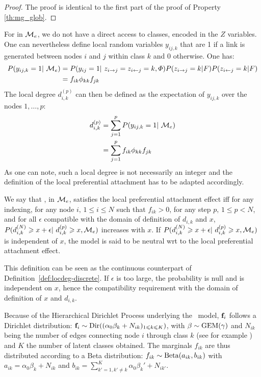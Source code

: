 \begin{proof}
The proof is identical to the first part of the proof of Property \ref{th:mg_glob}.
\end{proof}

\vspace{0.1cm}
For \textbf{\imb} in $\mathcal{M}_e$, we do not have a direct access to classes, encoded in the $Z$ variables. One can nevertheless define  local random variables $y_{ij,k}$ that are 1 if a link is generated between nodes $i$ and $j$ within class $k$ and 0 otherwise. One has:
%
\begin{align*}
P(y_{ij,k}=1 | \M_e) &= P(y_{ij}=1 | z_{i\rightarrow j} = z_{i\leftarrow j}=k, \Phi) P(z_{i\rightarrow j}=k|F)P(z_{i\leftarrow j}=k|F) \\
    &= f_{ik} \phi_{kk} f_{jk}
\end{align*}
%
The local degree $d_{i,k}^{(p)}$ can then be defined as the expectation of $y_{ij,k}$ over the nodes $1,\dotsc,p$:
%
\begin{align}\label{def:locdegimb}
d_{i,k}^{(p)} &= \sum_{j=1}^p P(y_{ij,k}=1 | \M_e)  \nonumber \\
    &= \sum_{j=1}^p f_{ik} \phi_{kk} f_{jk}
\end{align}
%
As one can note, such a local degree is not necessarily an integer and the definition of the local preferential attachment has to be adapted accordingly.
%
\begin{definition}
We say that \imb, in $\mathcal{M}_e$, satisfies the local preferential attachment effect iff for any indexing, for any node $i, \, 1\leq i \leq N$ such that $f_{ik}>0$, for any step $p, \, 1\leq p < N$, and  for all $\epsilon$ compatible with the domain of definition of $d_{i,k}$ and $x$, $P(d_{i,k}^{(N)} \geq x+\epsilon | d_{i,k}^{(p)} \geq x,\M_e)$ increases with $x$. If $P(d_{i,k}^{(N)} \geq x+\epsilon | d_{i,k}^{(p)} \geq x,\M_e)$ is independent of $x$, the model is said to be neutral wrt to the local preferential attachment effect.
\end{definition}

This definition can be seen as the continuous counterpart of Definition~\ref{def:locdeg-discrete}. If $\epsilon$ is too large, the probability is null and is independent on $x$, hence the compatibility requirement with the domain of definition of $x$ and $d_{i,k}$.

Because of the Hierarchical Dirichlet Process underlying the \imb\ model, $\mathbf{f}_i$ follows a Dirichlet distribution: $\mathbf{f}_i \sim \mathrm{Dir}((\alpha_0 \beta_k + N_{ik})_{1 \leqslant k \leqslant K})$, with $\mathbf{\beta}\sim \mathrm{GEM}(\gamma)$ and $N_{ik}$ being the number of edges connecting node $i$ through class $k$ (see for example \cite{teh2006hierarchical}) and $K$ the number of latent classes obtained. The marginals $f_{ik}$ are thus distributed according to a Beta distribution: $f_{ik} \sim \mathrm{Beta}(a_{ik}, b_{ik})$ with $a_{ik} = \alpha_0\beta_k + N_{ik}$ and $b_{ik} = \sum_{k'=1, k' \ne k}^{K} \alpha_0\beta_k' + N_{ik'}$.

